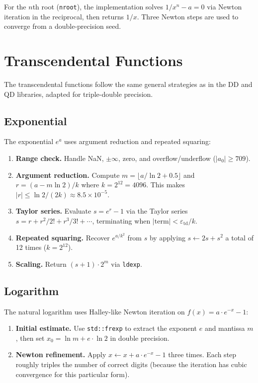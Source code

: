 \documentclass[11pt,a4paper]{article}
\begin{document}
For the $n$th root (\texttt{nroot}), the implementation solves
$1/x^n - a = 0$ via Newton iteration in the reciprocal, then
returns $1/x$.  Three Newton steps are used to converge from a
double-precision seed.


\section{Transcendental Functions}
\label{sec:transcendental}

The transcendental functions follow the same general strategies as in
the DD and QD libraries, adapted for triple-double precision.

\subsection{Exponential}

The exponential $e^a$ uses argument reduction and repeated squaring:
\begin{enumerate}
\item \textbf{Range check.}  Handle NaN, $\pm\infty$, zero, and
  overflow/underflow ($|a_0| \ge 709$).
\item \textbf{Argument reduction.}  Compute
  $m = \lfloor a / \ln 2 + 0.5 \rfloor$ and
  $r = (a - m \ln 2) / k$ where $k = 2^{12} = 4096$.
  This makes $|r| \le \ln 2 / (2k) \approx 8.5 \times 10^{-5}$.
\item \textbf{Taylor series.}  Evaluate $s = e^r - 1$ via the
  Taylor series $s = r + r^2/2! + r^3/3! + \cdots$, terminating
  when $|\text{term}| < \varepsilon_{\mathrm{td}} / k$.
\item \textbf{Repeated squaring.}  Recover $e^{a/k^2}$ from $s$ by
  applying $s \gets 2s + s^2$ a total of 12 times
  ($k = 2^{12}$).
\item \textbf{Scaling.}  Return $(s + 1) \cdot 2^m$ via
  \texttt{ldexp}.
\end{enumerate}

\subsection{Logarithm}

The natural logarithm uses Halley-like Newton iteration on $f(x) =
a \cdot e^{-x} - 1$:
\begin{enumerate}
\item \textbf{Initial estimate.}  Use \texttt{std::frexp} to extract
  the exponent $e$ and mantissa $m$, then set
  $x_0 = \ln m + e \cdot \ln 2$ in double precision.
\item \textbf{Newton refinement.}  Apply
  $x \gets x + a \cdot e^{-x} - 1$ three times.  Each step
  roughly triples the number of correct digits (because the
  iteration has cubic convergence for this particular form).
\end{enumerate}
\end{document}
